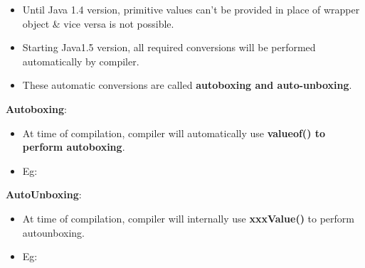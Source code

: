 \setlength{\columnsep}{3pt}
\begin{flushleft}
	

	\begin{itemize}
		\item Until Java 1.4 version, primitive values can't be provided in place of wrapper object \& vice versa is not possible.
		\item Starting Java1.5 version, all required conversions will be performed automatically by compiler.
		\item These automatic conversions are called \textbf{autoboxing and auto-unboxing}.
		
		
	\end{itemize}

	\textbf{Autoboxing}:
	\begin{itemize}
		\item At time of compilation, compiler will automatically use \textbf{valueof() to perform autoboxing}.
		\item Eg:
		\bigskip
		
	\end{itemize}
	
	\newpage
	
	\textbf{AutoUnboxing}:
	\begin{itemize}
		\item At time of compilation, compiler will internally use \textbf{xxxValue()} to perform autounboxing.
		\item Eg:
		\bigskip
	\end{itemize}
	
\end{flushleft}